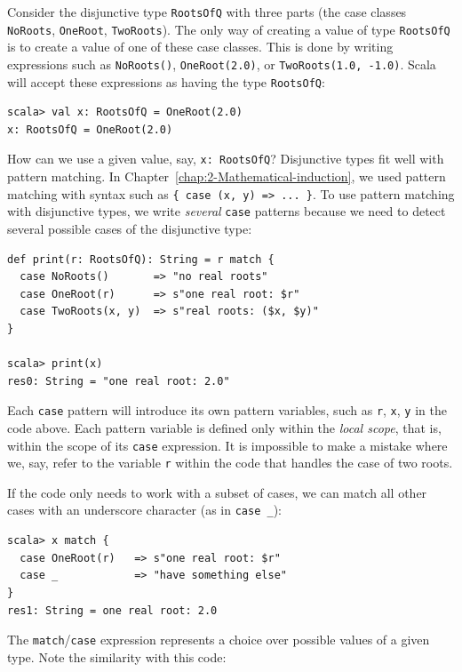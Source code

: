 Consider the disjunctive type \lstinline!RootsOfQ! with three parts
(the case classes \lstinline!NoRoots!, \lstinline!OneRoot!, \lstinline!TwoRoots!).
The only way of creating a value of type \lstinline!RootsOfQ! is
to create a value of one of these case classes. This is done by writing
expressions such as \lstinline!NoRoots()!, \lstinline!OneRoot(2.0)!,
or \lstinline!TwoRoots(1.0, -1.0)!. Scala will accept these expressions
as having the type \lstinline!RootsOfQ!:
\begin{lstlisting}
scala> val x: RootsOfQ = OneRoot(2.0)
x: RootsOfQ = OneRoot(2.0)
\end{lstlisting}

How can we use a given value, say, \lstinline!x: RootsOfQ!? Disjunctive
types fit well with pattern matching. In Chapter~\ref{chap:2-Mathematical-induction},
we used pattern matching with syntax such as \lstinline!{ case (x, y) => ... }!.
To use pattern matching with disjunctive types, we write \emph{several}
\lstinline!case! patterns because we need to detect several possible
cases of the disjunctive type:
\begin{lstlisting}
def print(r: RootsOfQ): String = r match {
  case NoRoots()       => "no real roots"
  case OneRoot(r)      => s"one real root: $r"
  case TwoRoots(x, y)  => s"real roots: ($x, $y)"
}

scala> print(x)
res0: String = "one real root: 2.0"
\end{lstlisting}
Each \lstinline!case! pattern will introduce its own pattern variables,
such as \lstinline!r!, \lstinline!x!, \lstinline!y!  in the code
above. Each pattern variable is defined only within the \emph{local
scope}, that is, within the scope of its \lstinline!case!
expression. It is impossible to make a mistake where we, say, refer
to the variable \lstinline!r! within the code that handles the case
of two roots.

If the code only needs to work with a subset of cases, we can match
all other cases with an underscore character (as in \lstinline!case _!):
\begin{lstlisting}
scala> x match {
  case OneRoot(r)   => s"one real root: $r"
  case _            => "have something else"
}
res1: String = one real root: 2.0
\end{lstlisting}
The \lstinline!match!/\lstinline!case! expression represents a choice
over possible values of a given type. Note the similarity with this
code:

